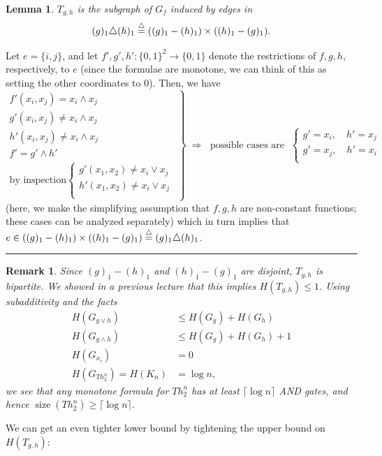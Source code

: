 \documentclass[twoside]{article}
\newcounter{tnum}
\newtheorem{lemma}[tnum]{Lemma}
\newtheorem{remark}[tnum]{Remark}
\newenvironment{proof}{{\bf Proof:}}{\hfill\rule{2mm}{2mm}}
\newcommand\size{\operatorname{size}}
\begin{document}
\begin{lemma}
$T_{g,h}$ is the subgraph of $G_f$ induced by edges in
\[ (g)_1 \triangle (h)_1 \buildrel\triangle\over =
((g)_1 - (h)_1) \times ((h)_1 - (g)_1).
\]
\label{l:2}
\end{lemma}
\vspace{-0.3in}
\begin{proof}
Let $e = \{i,j\}$, and let
$f',g',h' : \{0,1\}^2 \rightarrow \{0,1\}$ denote the restrictions of $f,g,h$,
respectively, to $e$ (since the formulae are monotone, we can think of this as
setting the other coordinates to $0$). Then, we have
\[\left.
    \begin{array}{r}
        f'(x_i,x_j) =     x_i \wedge x_j            \\
        g'(x_i,x_j) \neq  x_i \wedge x_j            \\
        h'(x_i,x_j) \neq  x_i \wedge x_j            \\
        f' = g' \wedge h'                           \\
        \mbox{by inspection} \left\{
            \begin{array}{cl}
                g'(x_1,x_2) \neq    x_i \vee x_j    \\
                h'(x_1,x_2) \neq    x_i \vee x_j    \\
            \end{array}
        \right.
    \end{array}
\right\}
\; \Rightarrow \; \mbox{ possible cases are } \; \left\{
            \begin{array}{cl}
                g' = x_i, \quad h' = x_j            \\
                g' = x_j, \quad h' = x_i            \\
            \end{array}
        \right.
\]
(here, we make the simplifying assumption that $f,g,h$ are non-constant
functions; these cases can be analyzed separately) which in turn implies that
$e
    \in ((g)_1 - (h)_1) \times ((h)_1 - (g)_1)
    \buildrel\triangle\over = (g)_1 \triangle (h)_1$.
\end{proof}
\begin{remark}
Since $(g)_1 - (h)_1$ and $(h)_1 - (g)_1$ are disjoint, $T_{g,h}$ is bipartite.
We showed in a previous lecture that this implies $H(T_{g,h}) \leq 1$. Using
subadditivity and the facts
\[
    \begin{array}{rl}
        H(G_{g \vee h})         & \leq H(G_g) + H(G_h)      \\
        H(G_{g \wedge h})       & \leq H(G_g) + H(G_h) + 1  \\
        H(G_{x_i})              & = 0                       \\
        H(G_{Th_2^n}) = H(K_n)  & = \log n,
    \end{array}
\]
we see that any monotone formula for $Th_2^n$ has at least
$\lceil \log n \rceil$ AND gates, and hence
$\size(Th_2^n) \geq \lceil \log n \rceil$.
\end{remark}
We can get an even tighter lower bound by tightening the upper bound on
$H(T_{g,h})$:
\end{document}
